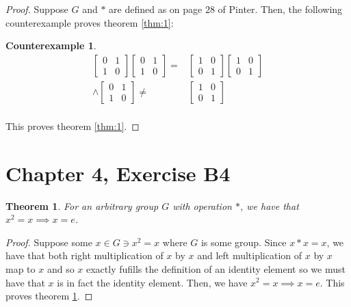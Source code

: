 \documentclass[12pt]{article}
\newtheorem{thm}{Theorem}
\newtheorem{cnt}{Counterexample}
\begin{document}
\begin{proof}
	Suppose $G$ and $*$ are defined as on page $28$ of Pinter. Then, the following counterexample proves theorem \ref{thm:1}:
	\begin{cnt}
		\begin{align*}
			\begin{bmatrix} 0 & 1 \\ 1 & 0 \end{bmatrix}
			\begin{bmatrix} 0 & 1 \\ 1 & 0 \end{bmatrix}
			= &
			\begin{bmatrix} 1 & 0 \\ 0 & 1 \end{bmatrix}
			\begin{bmatrix} 1 & 0 \\ 0 & 1 \end{bmatrix} \\
		\land 
			\begin{bmatrix} 0 & 1 \\ 1 & 0 \end{bmatrix}
		\neq &
			\begin{bmatrix} 1 & 0 \\ 0 & 1 \end{bmatrix} \\
		\end{align*}
	\end{cnt}
	This proves theorem \ref{thm:1}.
\end{proof}

\section{Chapter 4, Exercise B4}

\begin{thm} \label{thm:2}
	For an arbitrary group $G$ with operation $*$, we have that $x^2 = x \implies x = e$.
\end{thm}

\begin{proof}
	Suppose some $x \in G \ni x^2 = x$
	where $G$ is some group.
	Since $x * x = x$, we have that both
	right multiplication of $x$ by $x$ 
	and 
	left multiplication of $x$ by $x$ 
	map to $x$
	and so $x$ exactly fufills the definition of an identity element
	so we must have that $x$ is in fact the identity element.
	Then, we have $x^2 = x \implies x = e$.
	This proves theorem \ref{thm:2}.
\end{proof}
\end{document}
